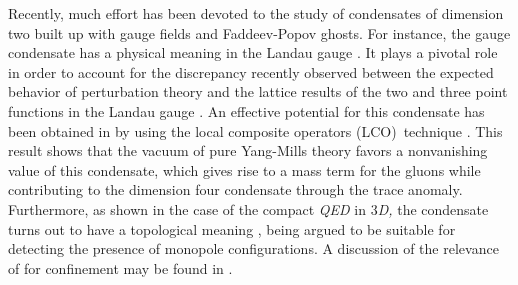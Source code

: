 \documentclass[a4paper,12pt]{article}
\begin{document}
Recently, much effort has been devoted to the study of condensates of
dimension two built up with gauge fields and Faddeev-Popov ghosts. For
instance, the gauge condensate \coordHE{}has a
physical meaning in the Landau gauge \cite{gz,vb}. It plays a pivotal role
in order to account for the discrepancy recently observed between the
expected behavior of perturbation theory and the lattice results of the two
and three point functions in the Landau gauge \cite{b23, gz1}. An effective
potential for this condensate has been obtained in \cite{v1} by using the
local composite operators (LCO)\ technique \cite{v2,v3}. This result shows
that the vacuum of pure Yang-Mills theory favors a nonvanishing value of
this condensate, which gives rise to a mass term for the gluons while
contributing to the dimension four condensate \coordHE{} through the trace anomaly. Furthermore, as shown in the
case of the compact \textit{QED }in 3\textit{D, }the condensate \coordHE{} turns out to have a topological meaning 
\cite{gz}, being argued to be suitable for detecting the presence of
monopole configurations. A discussion of the relevance of \coordHE{} for confinement may be found in \cite{conf}.
\end{document}
